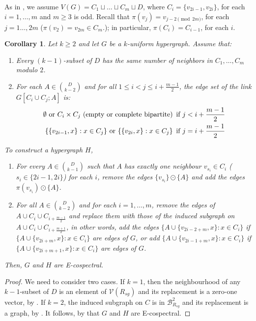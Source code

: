 \documentclass[12pt]{article}
\numberwithin{equation}{section}
\newtheorem{corollary}[theorem]{Corollary}
\theoremstyle{definition}
\newcommand{\ev}[1]{( #1 )}
\begin{document}
As in , we assume $V\ev{G} = C_1 \sqcup \ldots \sqcup C_{m} \sqcup D $, where $C_i = \{ v_{2i-1}, v_{2i}\}$, for each $i=1,\ldots, m$ and $m\geq 3$ is odd. Recall that $\pi\ev{v_j} = v_{j-2 \pmod{2m}}$, for each $j=1\ldots,2m$ ($\pi\ev{v_2} = v_{2m}\in C_m$.); in particular, $\pi\ev{C_i} = C_{i-1}$, for each $i$. 
\begin{corollary}
Let $k\geq 2$ and let $G$ be a $k$-uniform hypergraph. Assume that:
\begin{enumerate}
\item Every $(k-1)$-subset of $D$ has the same number of neighbors in $C_1,\ldots,C_m$ modulo $2$.
\item For each $A\in \binom{D}{k-2}$ and for all $1\leq i < j \leq i + \frac{m-1}{2}$, the edge set of the link $G[C_i \cup C_j;A]$ is:
\begin{align*}
\emptyset \text{ or } C_i \times C_j 				\ (\text{empty or complete bipartite})	 && \hspace{-3mm}  \text{ if } j < i + \frac{m-1}{2} \\ 
\{\{v_{2i-1}, x\} : x\in C_j\} \text{ or } \{\{v_{2i},x\}: x\in C_j\} 					     && \hspace{-3mm} \text{ if } j = i +\frac{m-1}{2}
\end{align*}
\end{enumerate}
To construct a hypergraph $H$, 
\begin{enumerate}
\item For every $A\in \binom{D}{k-1}$ such that $A$ has exactly one neighbour $v_{s_i} \in C_i$ ($s_i\in \{2i-1,2i\}$) for each $i$, remove the edges $ \{ v_{s_i} \} \odot \{ A \}$ and add the edges $ \pi\ev{ v_{s_i} } \odot \{A\}$. 
\item For all $A\in \binom{D}{k-2}$ and for each $i=1,\ldots,m$, remove the edges of $A\cup C_i \cup C_{i+\frac{m-1}{2}}$ and replace them with those of the induced subgraph on $A\cup C_i \cup C_{i+\frac{m+1}{2}}$, in other words, add the edges $\{A\cup\{v_{2i - 2 + m}, x\} : x\in C_i\}$ if $\{A\cup\{v_{2i + m}, x\} : x\in C_i\}$ are edges of $G$, or add $\{A\cup\{v_{2i - 1 + m}, x\} : x\in C_i\}$ if $\{A\cup\{v_{2i + m + 1}, x\} : x\in C_i\}$ are edges of $G$. 
\end{enumerate}
Then, $G$ and $H$ are E-cospectral.
\end{corollary}
\begin{proof}
We need to consider two cases. If $k=1$, then the neighbourhood of any $k-1$-subset of $D$ is an element of $\mathcal{V}\ev{R_{sg}}$ and its replacement is a zero-one vector, by . If $k=2$, the induced subgraph on $C$ is in $\mathcal{B}^2_{R_{sg}}$ and its replacement is a graph, by \cite[Theorem 5, p.~6]{abiad_berg_simoens}. It follows, by  that $G$ and $H$ are E-cospectral. 
\end{proof}
\end{document}
